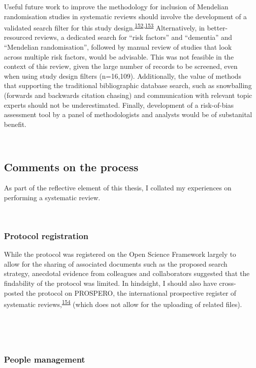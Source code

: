 \documentclass[a4paper, twoside]{templates/ociamthesis}
\begin{document}
Useful future work to improve the methodology for inclusion of Mendelian randomisation studies in systematic reviews should involve the development of a validated search filter for this study design.\textsuperscript{\protect\hyperlink{ref-waffenschmidt2020}{152},\protect\hyperlink{ref-wagner2020}{153}} Alternatively, in better-resourced reviews, a dedicated search for ``risk factors'' and ``dementia'' and ``Mendelian randomisation'', followed by manual review of studies that look across multiple risk factors, would be advisable. This was not feasible in the context of this review, given the large number of records to be screened, even when using study design filters (n=16,109). Additionally, the value of methods that supporting the traditional bibliographic database search, such as snowballing (forwards and backwards citation chasing) and communication with relevant topic experts should not be underestimated. Finally, development of a risk-of-bias assessment tool by a panel of methodologists and analysts would be of substanital benefit.

~

\hypertarget{comments-on-the-process}{%
\subsection{Comments on the process}\label{comments-on-the-process}}

As part of the reflective element of this thesis, I collated my experiences on performing a systematic review.

~

\hypertarget{protocol-registration}{%
\subsubsection{Protocol registration}\label{protocol-registration}}

While the protocol was registered on the Open Science Framework largely to allow for the sharing of associated documents such as the proposed search strategy, anecdotal evidence from colleagues and collaborators suggested that the findability of the protocol was limited. In hindsight, I should also have cross-posted the protocol on PROSPERO, the international prospective register of systematic reviews,\textsuperscript{\protect\hyperlink{ref-booth2011}{154}} (which does not allow for the uploading of related files).

~

~

\hypertarget{people-management}{%
\subsubsection{People management}\label{people-management}}
\end{document}
